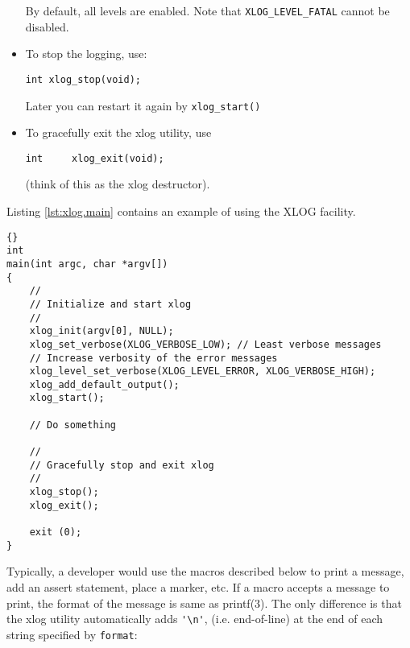 \documentclass[11pt]{article}
\begin{document}
\begin{itemize}
  By default, all levels are enabled.
  Note that \verb=XLOG_LEVEL_FATAL= cannot be disabled.

  \item To stop the logging, use:

\begin{verbatim}
int xlog_stop(void);
\end{verbatim}

  Later you can restart it again by \verb=xlog_start()=

  \item To gracefully exit the xlog utility, use

\begin{verbatim}
int     xlog_exit(void);
\end{verbatim}

  (think of this as the xlog destructor).

\end{itemize}

Listing \ref{lst:xlog.main} contains an example of using the XLOG facility.

\begin{lstlisting}[caption={An example of using the XLOG facility %
                                     \label{lst:xlog.main} } ]{}
int
main(int argc, char *argv[])
{
    //
    // Initialize and start xlog
    //
    xlog_init(argv[0], NULL);
    xlog_set_verbose(XLOG_VERBOSE_LOW);	// Least verbose messages
    // Increase verbosity of the error messages
    xlog_level_set_verbose(XLOG_LEVEL_ERROR, XLOG_VERBOSE_HIGH);
    xlog_add_default_output();
    xlog_start();

    // Do something

    //
    // Gracefully stop and exit xlog
    //
    xlog_stop();
    xlog_exit();

    exit (0);
}
\end{lstlisting}

Typically, a developer would use the macros described below
to print a message, add an assert statement, place a marker, etc.
If a macro accepts a message to print, the format of the message is same
as printf(3). The only difference is that the xlog utility automatically
adds \verb='\n'=, (i.e. end-of-line) at the end of each string
specified by \verb=format=:
\end{document}
